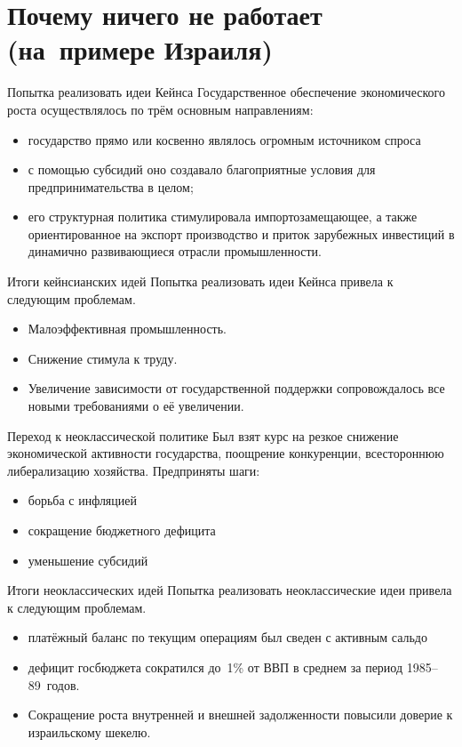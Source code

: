 \documentclass{beamer}
\begin{document}
	\section{Почему ничего не работает (на~примере Израиля)}
	
	\begin{frame}{Попытка реализовать идеи Кейнса}
		Государственное обеспечение экономического роста осуществлялось по трём основным направлениям:
		\begin{itemize}
		\item государство прямо или косвенно являлось огромным источником спроса
		\item с помощью субсидий оно создавало благоприятные условия для предпринимательства в целом;
		\item его структурная политика стимулировала импортозамещающее, а также ориентированное на экспорт производство и приток зарубежных инвестиций в динамично развивающиеся отрасли промышленности.
		\end{itemize}
	\end{frame}

	\begin{frame}{Итоги кейнсианских идей}
		Попытка реализовать идеи Кейнса привела к следующим проблемам.
		\begin{itemize}
			\item Малоэффективная промышленность.
			\item Снижение стимула к труду.
			\item Увеличение зависимости от государственной поддержки сопровождалось все новыми требованиями о её увеличении.
		\end{itemize}
	\end{frame}

	\begin{frame}{Переход к неоклассической политике}
		Был взят курс на резкое снижение экономической активности государства, поощрение конкуренции, всестороннюю либерализацию хозяйства.
		Предприняты шаги:
		\begin{itemize}
		\item борьба с инфляцией
		\item сокращение бюджетного дефицита
		\item уменьшение субсидий
		\end{itemize}
	\end{frame}
	
	\begin{frame}{Итоги неоклассических идей}
		Попытка реализовать неоклассические идеи привела к следующим проблемам.
		\begin{itemize}
			\item платёжный баланс по текущим операциям был сведен с активным сальдо
			\item дефицит госбюджета сократился до~1\% от ВВП в среднем за период 1985--89~годов.
			\item Сокращение роста внутренней и внешней задолженности повысили доверие к израильскому шекелю.
		\end{itemize}
	\end{frame}
	
\end{document}
